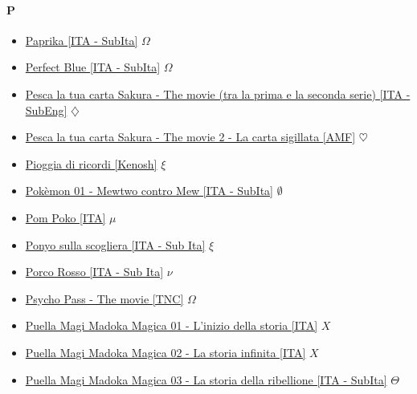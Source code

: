 		\paragraph{P} \hypertarget{FP}{}
			\begin{itemize}
			
			\item \href{https://mega.nz/#!Iqg2XJzC!V4_bJIe7xh6kZmDrKre4zvqvV2IFb7aP9ba9EukjaGk} {Paprika [ITA - SubIta]} $\Omega$   \\
			\item \href{https://mega.nz/#!cuonkYbZ!2uqv9B5aZZzMFbidAk6K83odzqmazdUj3kyKxQo6cSA} {Perfect Blue [ITA - SubIta]} $\Omega$   \\
			\item \href{https://mega.nz/#!R1QTAIhb!Lf4vUxGIAb5kvyJVM5DTsUE4A01JqVlCV1KyGe05DDY} {Pesca la tua carta Sakura - The movie (tra la prima e la seconda serie) [ITA - SubEng]} $\diamondsuit$   \\
			\item \href{https://mega.nz/#!jqwUGSxC!0nPB11IYaJA4SPCs-neoIIkYT3tsp6pt3RNULtUoGwc} {Pesca la tua carta Sakura - The movie 2 - La carta sigillata [AMF]} $\heartsuit$   \\
			\item \href{https://mega.nz/#!2sxyWD6A!XIGT7uc6CGg2zVgKGZA93emvArHls9Ts9LcEjKN01rE} {Pioggia di ricordi [Kenosh]} $\xi$   \\
			\item \href{https://mega.nz/#F!kP5hGLpa!UrqKl48hkG0TanUo70h27w} {Pokèmon 01 - Mewtwo contro Mew [ITA - SubIta]} $\emptyset$   \\
			\item \href{https://mega.nz/#F!1xxXkRTR!ctcNSCo4_DrW99L26Aiaig} {Pom Poko [ITA]} $\mu$   \\
			\item \href{https://mega.nz/#!b4YwXRAQ!9ABa4OnfVu-Sv7HpWeKQG7KU7b7g6SJGNLc6WfljJaw} {Ponyo sulla scogliera [ITA - Sub Ita]} $\xi$   \\
			\item \href{https://mega.nz/#!K4MTHSiL!b9pMMSahTNUXiYduGw_l3uOYoBjak5MSpE8WHpmYmHg} {Porco Rosso [ITA - Sub Ita]} $\nu$ \\
			\item \href{https://mega.nz/#!huwz1b7R!deHWFw_lwWDCVmUaD3WvBuPSyT1lKjqLS27fTnZttI4} {Psycho Pass - The movie [TNC]} $\Omega$ \\
			\item \href{https://mega.nz/#!F7Q2QSSQ!Ks-W1CoXoeqD4K09XoPoGfBkxlDygcJ0IT-I0Zd4BE8} {Puella Magi Madoka Magica 01 - L'inizio della storia [ITA]} $X$ \\
			\item \href{https://mega.nz/#!46QRVbII!Kvf_bHtNACfEfK8UK5LffWXzy5Mrhwj58X-W3uokjo0} {Puella Magi Madoka Magica 02 - La storia infinita [ITA]} $X$ \\
			\item \href{https://mega.nz/#!FHhW2JBB!vM9TVh9KxgEmwpVMQ4uFiPoM_LGYvvVNvhidevD8O8s} {Puella Magi Madoka Magica 03 - La storia della ribellione [ITA - SubIta]} $\varTheta$ \\
						
		\end{itemize}	
	
